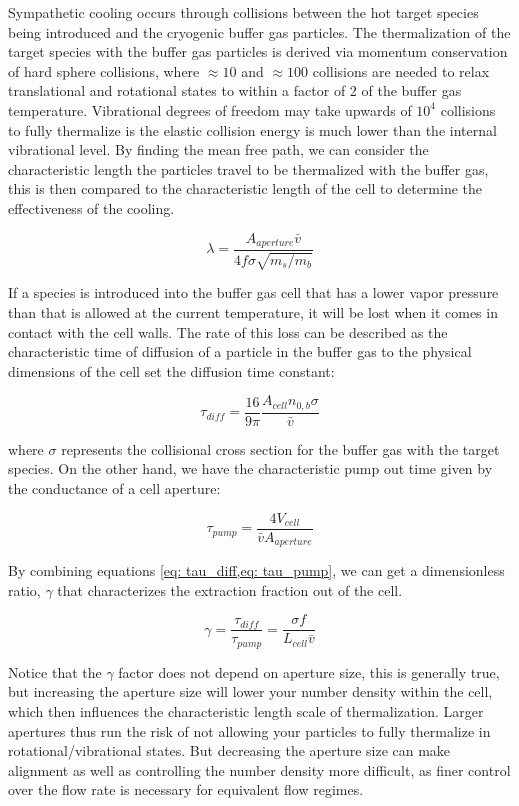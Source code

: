 Sympathetic cooling occurs through collisions between the hot target species being introduced and the cryogenic buffer gas particles. The thermalization of the target species with the buffer gas particles is derived via momentum conservation of hard sphere collisions, where $\approx 10$ and $\approx 100$ collisions are needed to relax translational and rotational states to within a factor of 2 of the buffer gas temperature. Vibrational degrees of freedom may take upwards of $10^4$ collisions to fully thermalize is the elastic collision energy is much lower than the internal vibrational level. By finding the mean free path, we can consider the characteristic length the particles travel to be thermalized with the buffer gas, this is then compared to the characteristic length of the cell to determine the effectiveness of the cooling.

\begin{equation*}
	\lambda = \frac{A_{aperture} \bar{v}}{4 f \sigma \sqrt{m_s/m_b}}
\end{equation*}

If a species is introduced into the buffer gas cell that has a lower vapor pressure than that is allowed at the current temperature, it will be lost when it comes in contact with the cell walls. The rate of this loss can be described as the  characteristic time of diffusion of a particle in the buffer gas to the physical dimensions of the cell set the diffusion time constant:

\begin{equation}
	\tau_{diff} = \frac{16}{9 \pi} \frac{A_{cell} n_{0,b} \sigma}{\bar{v}} \label{eq: tau_diff}
\end{equation}

where $\sigma$ represents the collisional cross section for the buffer gas with the target species. On the other hand, we have the characteristic pump out time given by the conductance of a cell aperture:

\begin{equation}
	\tau_{pump}=\frac{4V_{cell}}{\bar{v}A_{aperture}} \label{eq: tau_pump}
\end{equation}

By combining equations \cref{eq: tau_diff,eq: tau_pump}, we can get a dimensionless ratio, $\gamma$ that characterizes the extraction fraction out of the cell.

\begin{equation}
	\gamma = \frac{\tau_{diff}}{\tau_{pump}} = \frac{\sigma f}{L_{cell} \bar{v}} \label{eq: gamma}
\end{equation}

Notice that the $\gamma$ factor does not depend on aperture size, this is generally true, but increasing the aperture size will lower your number density within the cell, which then influences the characteristic length scale of thermalization. Larger apertures thus run the risk of not allowing your particles to fully thermalize in rotational/vibrational states. But decreasing the aperture size can make alignment as well as controlling the number density more difficult, as finer control over the flow rate is necessary for equivalent flow regimes.
